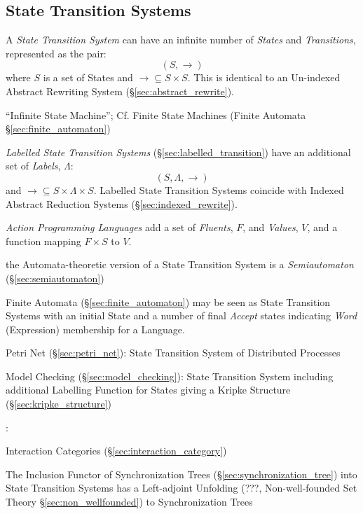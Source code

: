 \subsection{State Transition Systems}\label{sec:state_transition}

A \emph{State Transition System} can have an infinite number of
\emph{States} and \emph{Transitions}, represented as the pair:
\[
  (S,\rightarrow)
\]
where $S$ is a set of States and $\rightarrow \subseteq S \times S$.
This is identical to an Un-indexed Abstract Rewriting System
(\S\ref{sec:abstract_rewrite}).

``Infinite State Machine''; \fist Cf. Finite State Machines (Finite
Automata \S\ref{sec:finite_automaton})

\emph{Labelled State Transition Systems}
(\S\ref{sec:labelled_transition}) have an additional set of
\emph{Labels}, $\Lambda$:
\[
  (S,\Lambda,\rightarrow)
\]
and $\rightarrow \subseteq S \times \Lambda \times S$. Labelled State
Transition Systems coincide with Indexed Abstract Reduction Systems
(\S\ref{sec:indexed_rewrite}).

\emph{Action Programming Languages} add a set of \emph{Fluents}, $F$, and
\emph{Values}, $V$, and a function mapping $F \times S$ to $V$.

the Automata-theoretic version of a State Transition System is a
\emph{Semiautomaton} (\S\ref{sec:semiautomaton})

Finite Automata (\S\ref{sec:finite_automaton}) may be seen as State
Transition Systems with an initial State and a number of final
\emph{Accept} states indicating \emph{Word} (Expression) membership
for a Language.

Petri Net (\S\ref{sec:petri_net}): State Transition System of
Distributed Processes

Model Checking (\S\ref{sec:model_checking}): State Transition System
including additional Labelling Function for States giving a Kripke
Structure (\S\ref{sec:kripke_structure})


\asterism


\cite{abramsky-gay-nagarajan96}:

Interaction Categories (\S\ref{sec:interaction_category})

The Inclusion Functor of Synchronization Trees
(\S\ref{sec:synchronization_tree}) into State Transition Systems has a
Left-adjoint Unfolding (???, Non-well-founded Set Theory
\S\ref{sec:non_wellfounded}) to Synchronization Trees



